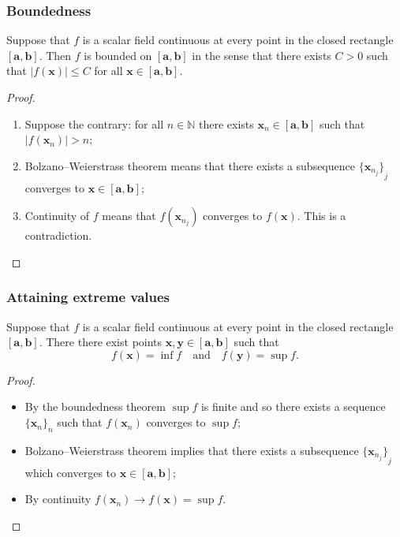 \documentclass[aspectratio=169,handout]{beamer}
\newcommand{\abs}[1]{\left|#1\right|} %
\newcommand{\bN}{\mathbb{N}} %
\renewcommand{\aa}{\mathbf{a}}
\newcommand{\bb}{\mathbf{b}}
\newcommand{\xx}{\mathbf{x}}
\newcommand{\yy}{\mathbf{y}}
\begin{document}
\begin{frame}
    \frametitle{Boundedness}

    \begin{theorem}
        Suppose that \(f\) is a scalar field continuous at every point in the closed rectangle \([\aa,\bb]\).
        Then \(f\) is bounded on \([\aa,\bb]\) in the sense that there exists \(C>0\) such that \(\abs{f(\xx)} \leq C\) for all \(\xx \in [\aa,\bb]\).
    \end{theorem}


    \begin{proof}
        \begin{enumerate}
            \item Suppose the contrary: for all \(n\in\bN\) there exists \(\xx_n\in [\aa,\bb]\) such that \(\abs{f(\xx_n)}>n\);
            \item Bolzano–Weierstrass theorem means that there exists a subsequence \({\{\xx_{n_j}\}}_{j}\) converges to \( \xx \in [\aa,\bb]\);
            \item Continuity of \(f\) means that \(f(\xx_{n_j})\) converges to \(f(\xx)\). This is a contradiction.
        \end{enumerate}



    \end{proof}

\end{frame}

\begin{frame}
    \frametitle{Attaining extreme values}

    \begin{theorem}
        Suppose that \(f\) is a scalar field continuous at every point in the closed rectangle \([\aa,\bb]\).
        There there exist points \( \xx, \yy \in [\aa,\bb]\) such that
        \[
            f(\xx) = \inf f
            \quad \text{and} \quad
            f(\yy)= \sup f.
        \]
    \end{theorem}

    \begin{proof}
        \begin{itemize}
            \item  By the boundedness theorem \(\sup f\) is finite and so there exists a sequence  \({\{\xx_{n}\}}_{n}\)  such that \(f(\xx_n)\) converges to \(\sup f\);
            \item Bolzano–Weierstrass theorem implies that there exists a subsequence  \({\{\xx_{n_j}\}}_{j}\) which converges to \( \xx \in [\aa,\bb]\);
            \item By continuity \(f(\xx_n) \to f(\xx) = \sup f\).
        \end{itemize}
    \end{proof}


\end{frame}
\end{document}
